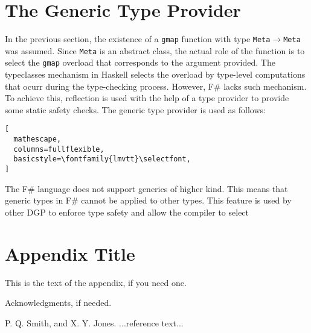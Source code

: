 \documentclass{sigplanconf}
\begin{document}
\section{The Generic Type Provider}
In the previous section, the existence of a \verb+gmap+ function with type \verb+Meta+$\to$\verb+Meta+ was assumed. Since \verb+Meta+ is an abstract class, the actual role of the function is to select the \verb+gmap+ overload that corresponds to the argument provided. The typeclasses mechanism in Haskell selects the overload by type-level computations that ocurr during the type-checking process. However, F\# lacks such mechanism. To achieve this, reflection is used with the help of a type provider to provide some static safety checks. The generic type provider is used as follows:
\begin{lstlisting}[
  mathescape,
  columns=fullflexible,
  basicstyle=\fontfamily{lmvtt}\selectfont,
]
\end{lstlisting}

The F\# language does not support generics of higher kind. This means that generic types in F\# cannot be applied to other types. This feature is used by other DGP \cite{Regular,MultiRec,GenericDeriving,RepLib} to enforce type safety and allow the compiler to select  

\appendix
\section{Appendix Title}

This is the text of the appendix, if you need one.

\acks

Acknowledgments, if needed.





\begin{thebibliography}{}
\softraggedright

P. Q. Smith, and X. Y. Jones. ...reference text...

\end{thebibliography}
\end{document}
